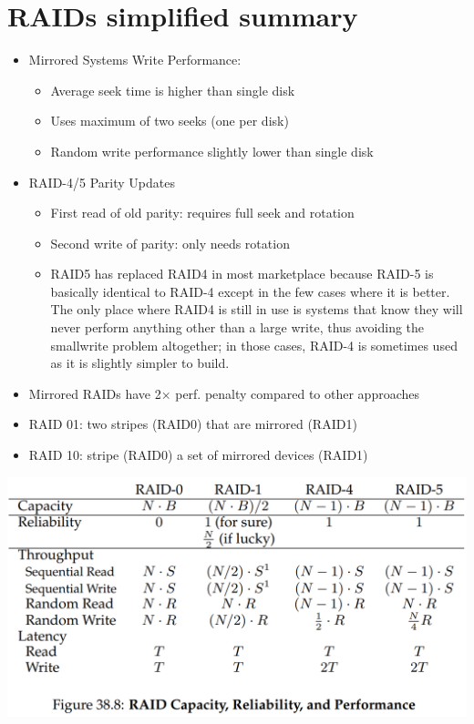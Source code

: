 \section*{RAIDs simplified summary}
\begin{itemize}
\item Mirrored Systems Write Performance:
  \begin{itemize}
  \item Average seek time is higher than single disk
  \item Uses maximum of two seeks (one per disk)
  \item Random write performance slightly lower than single disk
  \end{itemize}
\item RAID-4/5 Parity Updates
  \begin{itemize}
  \item First read of old parity: requires full seek and rotation
  \item Second write of parity: only needs rotation
  \item RAID5 has replaced RAID4 in most marketplace because RAID-5 is basically identical to RAID-4 except in the few cases where it is better. The only place where RAID4 is still in use is systems that know they will never perform anything other than a large write, thus avoiding the smallwrite problem altogether; in those cases, RAID-4 is sometimes used as it is slightly simpler to build.
  \end{itemize}
\item Mirrored RAIDs have 2× perf. penalty compared to other approaches
\item RAID 01: two stripes (RAID0) that are mirrored (RAID1)
\item RAID 10: stripe (RAID0) a set of mirrored devices (RAID1)
\end{itemize}
\includegraphics[width=\linewidth]{imgs/raid_compare}
